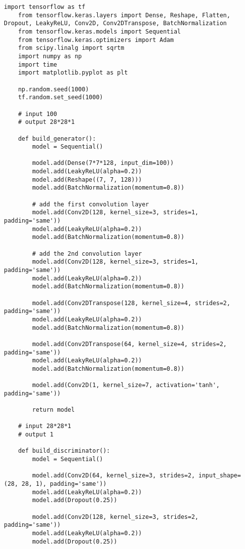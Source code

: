 \begin{lstlisting}[style=mypython, caption=Explore GAN with more convolutional layers 2]
    import tensorflow as tf
    from tensorflow.keras.layers import Dense, Reshape, Flatten, Dropout, LeakyReLU, Conv2D, Conv2DTranspose, BatchNormalization
    from tensorflow.keras.models import Sequential
    from tensorflow.keras.optimizers import Adam
    from scipy.linalg import sqrtm
    import numpy as np
    import time
    import matplotlib.pyplot as plt
    
    np.random.seed(1000)
    tf.random.set_seed(1000)
    
    # input 100
    # output 28*28*1
    
    def build_generator():
        model = Sequential()
        
        model.add(Dense(7*7*128, input_dim=100))
        model.add(LeakyReLU(alpha=0.2))
        model.add(Reshape((7, 7, 128)))
        model.add(BatchNormalization(momentum=0.8))
    
        # add the first convolution layer
        model.add(Conv2D(128, kernel_size=3, strides=1, padding='same'))
        model.add(LeakyReLU(alpha=0.2))
        model.add(BatchNormalization(momentum=0.8))
    
        # add the 2nd convolution layer
        model.add(Conv2D(128, kernel_size=3, strides=1, padding='same'))
        model.add(LeakyReLU(alpha=0.2))
        model.add(BatchNormalization(momentum=0.8))
    
        model.add(Conv2DTranspose(128, kernel_size=4, strides=2, padding='same'))
        model.add(LeakyReLU(alpha=0.2))
        model.add(BatchNormalization(momentum=0.8))
    
        model.add(Conv2DTranspose(64, kernel_size=4, strides=2, padding='same'))
        model.add(LeakyReLU(alpha=0.2))
        model.add(BatchNormalization(momentum=0.8))
    
        model.add(Conv2D(1, kernel_size=7, activation='tanh', padding='same'))
    
        return model
    
    # input 28*28*1
    # output 1
    
    def build_discriminator():
        model = Sequential()
        
        model.add(Conv2D(64, kernel_size=3, strides=2, input_shape=(28, 28, 1), padding='same'))
        model.add(LeakyReLU(alpha=0.2))
        model.add(Dropout(0.25))
    
        model.add(Conv2D(128, kernel_size=3, strides=2, padding='same'))
        model.add(LeakyReLU(alpha=0.2))
        model.add(Dropout(0.25))
    

\end{lstlisting}
